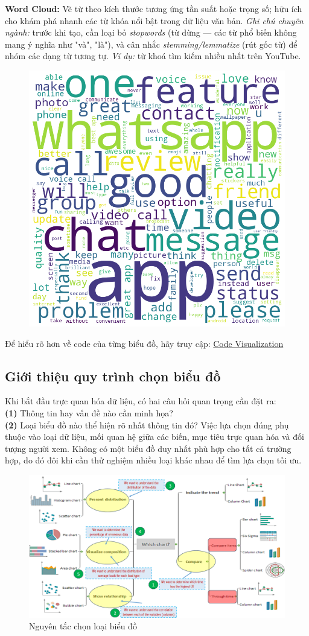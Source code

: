\documentclass[11pt]{article}
\begin{document}
\medskip
\textbf{Word Cloud:} Vẽ từ theo kích thước tương ứng tần suất hoặc trọng số; hữu ích cho khám phá nhanh các từ khóa nổi bật trong dữ liệu văn bản.
\textit{Ghi chú chuyên ngành:} trước khi tạo, cần loại bỏ \emph{stopwords} (từ dừng — các từ phổ biến không mang ý nghĩa như "và", "là"), và cân nhắc \emph{stemming/lemmatize} (rút gốc từ) để nhóm các dạng từ tương tự.
\textit{Ví dụ:} từ khoá tìm kiếm nhiều nhất trên YouTube.
\begin{figure}[H]
    \centering
    \includegraphics[width=0.5\linewidth]{images/WordCloud.png}
\end{figure}

Để hiểu rõ hơn về code của từng biểu đồ, hãy truy cập: \href{https://drive.google.com/file/d/1BkQBikJYrhgLE_gemTrOTmcgx8GPVUrS/view?usp=sharing}{Code Visualization}


\subsection{Giới thiệu quy trình chọn biểu đồ}
Khi bắt đầu trực quan hóa dữ liệu, có hai câu hỏi quan trọng cần đặt ra: \\
\textbf{(1)} Thông tin hay vấn đề nào cần minh họa? \\
\textbf{(2)} Loại biểu đồ nào thể hiện rõ nhất thông tin đó? Việc lựa chọn đúng phụ thuộc vào loại dữ liệu, mối quan hệ giữa các biến, mục tiêu trực quan hóa và đối tượng người xem. Không có một biểu đồ duy nhất phù hợp cho tất cả trường hợp, do đó đôi khi cần thử nghiệm nhiều loại khác nhau để tìm lựa chọn tối ưu.

\begin{figure}[H]
    \centering
    \includegraphics[width=0.9\linewidth]{images/graph_to_choose_whichChart.png}
    \caption{Nguyên tắc chọn loại biểu đồ}
    \label{fig:which chart}
\end{figure}
\end{document}
